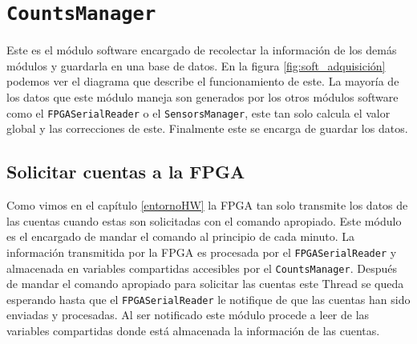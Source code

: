 \section{\texttt{CountsManager}}
	Este es el módulo software encargado de recolectar la información de los demás módulos y guardarla en una base de datos. En la figura 
	\ref{fig:soft_adquisición} podemos ver el diagrama que describe el funcionamiento de este. La mayoría de los datos que este módulo maneja son
	generados por los otros módulos software como el \texttt{FPGASerialReader} o el \texttt{SensorsManager}, este tan solo calcula el valor global
	y las correcciones de este. Finalmente este se encarga de guardar los datos. 
	\subsection{Solicitar cuentas a la FPGA}
		Como vimos en el capítulo \ref{entornoHW} la FPGA tan solo transmite los datos de las cuentas cuando estas son solicitadas con el
		comando apropiado. Este módulo es el encargado de mandar el comando al principio de cada minuto. La información transmitida por la
		FPGA es procesada por el \texttt{FPGASerialReader} y almacenada en variables compartidas accesibles por el \texttt{CountsManager}.
		Después de mandar el comando apropiado para solicitar las cuentas este Thread se queda esperando hasta que el \texttt{FPGASerialReader}
		le notifique de que las cuentas han sido enviadas y procesadas. Al ser notificado este módulo procede a leer de las variables
		compartidas donde está almacenada la información de las cuentas.
